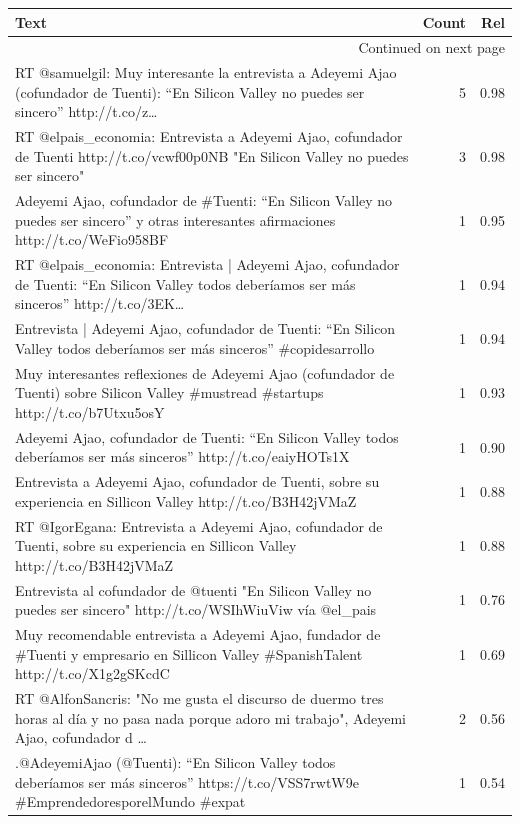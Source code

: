 \begin{longtable}{p{12.5cm}rr}
\toprule
Text & Count & Rel \\
\midrule
\endhead
\midrule
\multicolumn{3}{r}{{Continued on next page}} \\
\midrule
\endfoot

\bottomrule
\endlastfoot
RT @samuelgil: Muy interesante la entrevista a Adeyemi Ajao (cofundador de Tuenti): “En Silicon Valley no puedes ser sincero” http://t.co/z… & 5 & 0.98 \\
RT @elpais\_economia: Entrevista a Adeyemi Ajao, cofundador de Tuenti http://t.co/vcwf00p0NB "En Silicon Valley no puedes ser sincero" & 3 & 0.98 \\
Adeyemi Ajao, cofundador de \#Tuenti: “En Silicon Valley no puedes ser sincero” y otras interesantes afirmaciones http://t.co/WeFio958BF & 1 & 0.95 \\
RT @elpais\_economia: Entrevista | Adeyemi Ajao, cofundador de Tuenti: “En Silicon Valley todos deberíamos ser más sinceros” http://t.co/3EK… & 1 & 0.94 \\
Entrevista | Adeyemi Ajao, cofundador de Tuenti: “En Silicon Valley todos deberíamos ser más sinceros”  \#copidesarrollo & 1 & 0.94 \\
Muy interesantes reflexiones de Adeyemi Ajao (cofundador de Tuenti) sobre Silicon Valley \#mustread \#startups http://t.co/b7Utxu5osY & 1 & 0.93 \\
Adeyemi Ajao, cofundador de Tuenti: “En Silicon Valley todos deberíamos ser más sinceros” http://t.co/eaiyHOTs1X & 1 & 0.90 \\
Entrevista a Adeyemi Ajao, cofundador de Tuenti, sobre su experiencia en Sillicon Valley http://t.co/B3H42jVMaZ & 1 & 0.88 \\
RT @IgorEgana: Entrevista a Adeyemi Ajao, cofundador de Tuenti, sobre su experiencia en Sillicon Valley http://t.co/B3H42jVMaZ & 1 & 0.88 \\
Entrevista al cofundador de @tuenti "En Silicon Valley no puedes ser sincero" http://t.co/WSIhWiuViw vía @el\_pais & 1 & 0.76 \\
Muy recomendable entrevista a Adeyemi Ajao, fundador de \#Tuenti y empresario en Sillicon Valley \#SpanishTalent http://t.co/X1g2gSKcdC & 1 & 0.69 \\
RT @AlfonSancris: "No me gusta el discurso de duermo tres horas al día y no pasa nada porque adoro mi trabajo", Adeyemi Ajao, cofundador d … & 2 & 0.56 \\
.@AdeyemiAjao (@Tuenti): “En Silicon Valley todos deberíamos ser más sinceros” https://t.co/VSS7rwtW9e \#EmprendedoresporelMundo \#expat & 1 & 0.54 \\

\end{longtable}
